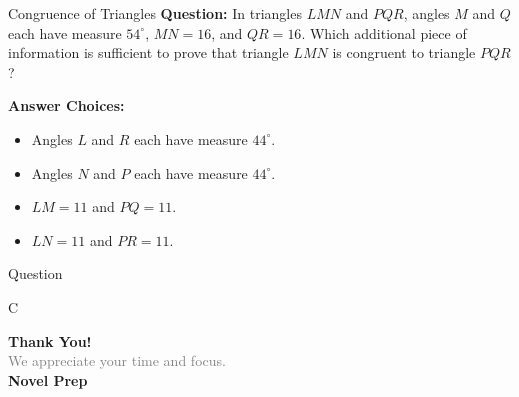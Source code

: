 \documentclass{beamer}
\begin{document}
\begin{frame}{Congruence of Triangles}
\textbf{Question:}
In triangles \(LMN\) and \(PQR\), angles \(M\) and \(Q\) each have measure \(54^\circ\), \(MN = 16\), and \(QR = 16\). Which additional piece of information is sufficient to prove that triangle \(LMN\) is congruent to triangle \(PQR\)?

\vspace{1em}
\textbf{Answer Choices:}
\begin{itemize}
    \item[A] Angles \(L\) and \(R\) each have measure \(44^\circ\).
    \item[B] Angles \(N\) and \(P\) each have measure \(44^\circ\).
    \item[C] \(LM = 11\) and \(PQ = 11\).
    \item[D] \(LN = 11\) and \(PR = 11\).
\end{itemize}
\end{frame}

\begin{frame}{Question}

C
    
\end{frame}








\begin{frame}{}

    \centering
    \vspace{5em}

    {\Huge \textbf{\textcolor{novelPurple}{Thank You!}}} \\[1em]
    {\large \textcolor{gray}{We appreciate your time and focus.}} \\[3em]

    {\LARGE \textbf{\textcolor{novelPurple}{\textsf{Novel Prep}}}}

    \vfill
\end{frame}
\end{document}
